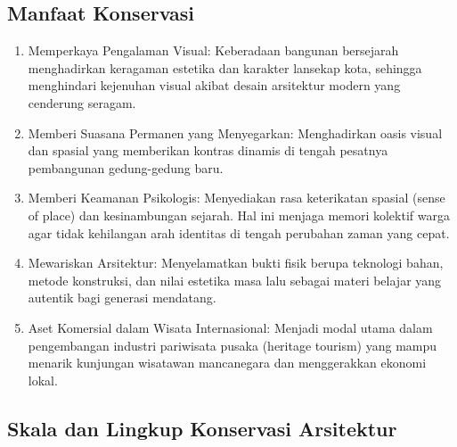 \documentclass[../rumukota.tex]{subfiles}
\begin{document}
\subsection{Manfaat Konservasi}%
\label{sub:manfaat_konservasi}

\begin{enumerate}
	\item Memperkaya Pengalaman Visual: Keberadaan bangunan bersejarah menghadirkan keragaman estetika dan karakter lansekap kota, sehingga menghindari kejenuhan visual akibat desain arsitektur modern yang cenderung seragam.
	\item Memberi Suasana Permanen yang Menyegarkan: Menghadirkan oasis visual dan spasial yang memberikan kontras dinamis di tengah pesatnya pembangunan gedung-gedung baru.
	\item Memberi Keamanan Psikologis: Menyediakan rasa keterikatan spasial (sense of place) dan kesinambungan sejarah. Hal ini menjaga memori kolektif warga agar tidak kehilangan arah identitas di tengah perubahan zaman yang cepat.
	\item Mewariskan Arsitektur: Menyelamatkan bukti fisik berupa teknologi bahan, metode konstruksi, dan nilai estetika masa lalu sebagai materi belajar yang autentik bagi generasi mendatang.
	\item Aset Komersial dalam Wisata Internasional: Menjadi modal utama dalam pengembangan industri pariwisata pusaka (heritage tourism) yang mampu menarik kunjungan wisatawan mancanegara dan menggerakkan ekonomi lokal.
\end{enumerate}

\subsection{Skala dan Lingkup Konservasi Arsitektur}%
\label{sub:skala_dan_lingkup_konservasi_arsitektur}
\end{document}

